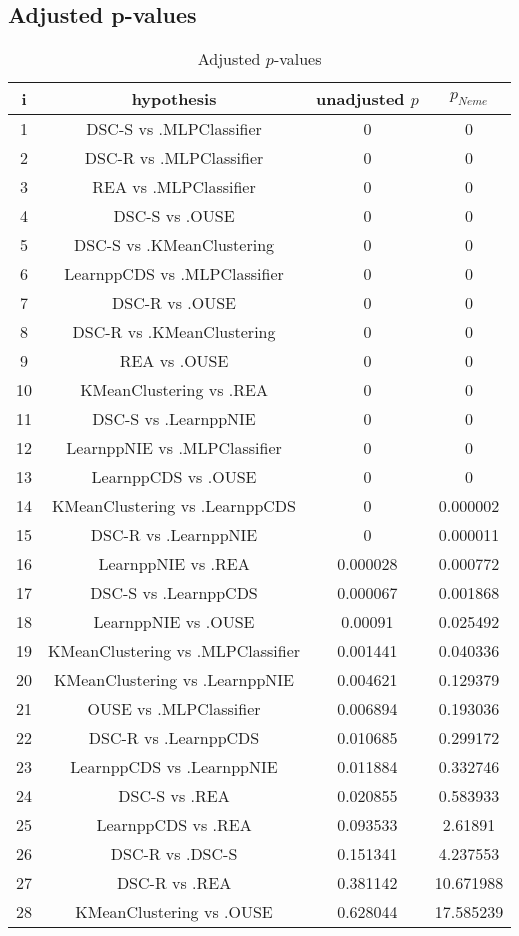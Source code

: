 \documentclass[a4paper,10pt]{article}
\begin{document}
\begin{landscape}
\pagebreak

\subsection{Adjusted p-values}

\begin{table}[!htp]
\centering\scriptsize
\begin{tabular}{cccc}
i&hypothesis&unadjusted $p$&$p_{Neme}$\\
\hline1&DSC-S vs .MLPClassifier&0&0\\
2&DSC-R vs .MLPClassifier&0&0\\
3&REA vs .MLPClassifier&0&0\\
4&DSC-S vs .OUSE&0&0\\
5&DSC-S vs .KMeanClustering&0&0\\
6&LearnppCDS vs .MLPClassifier&0&0\\
7&DSC-R vs .OUSE&0&0\\
8&DSC-R vs .KMeanClustering&0&0\\
9&REA vs .OUSE&0&0\\
10&KMeanClustering vs .REA&0&0\\
11&DSC-S vs .LearnppNIE&0&0\\
12&LearnppNIE vs .MLPClassifier&0&0\\
13&LearnppCDS vs .OUSE&0&0\\
14&KMeanClustering vs .LearnppCDS&0&0.000002\\
15&DSC-R vs .LearnppNIE&0&0.000011\\
16&LearnppNIE vs .REA&0.000028&0.000772\\
17&DSC-S vs .LearnppCDS&0.000067&0.001868\\
18&LearnppNIE vs .OUSE&0.00091&0.025492\\
19&KMeanClustering vs .MLPClassifier&0.001441&0.040336\\
20&KMeanClustering vs .LearnppNIE&0.004621&0.129379\\
21&OUSE vs .MLPClassifier&0.006894&0.193036\\
22&DSC-R vs .LearnppCDS&0.010685&0.299172\\
23&LearnppCDS vs .LearnppNIE&0.011884&0.332746\\
24&DSC-S vs .REA&0.020855&0.583933\\
25&LearnppCDS vs .REA&0.093533&2.61891\\
26&DSC-R vs .DSC-S&0.151341&4.237553\\
27&DSC-R vs .REA&0.381142&10.671988\\
28&KMeanClustering vs .OUSE&0.628044&17.585239\\
\hline
\end{tabular}
\caption{Adjusted $p$-values}
\end{table}

\end{landscape}
\end{document}
